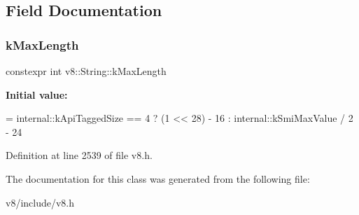 \subsection{Field Documentation}
\mbox{\label{classv8_1_1String_a66259940a4836974906729017ff25fd2}} 
\subsubsection{\texorpdfstring{k\+Max\+Length}{kMaxLength}}
{\footnotesize\ttfamily constexpr int v8\+::\+String\+::k\+Max\+Length\hspace{0.3cm}{\ttfamily [static]}}

{\bfseries Initial value\+:}
\begin{DoxyCode}
= internal::kApiTaggedSize == 4
                                        ? (1 << 28) - 16
                                        : internal::kSmiMaxValue / 2 - 24
\end{DoxyCode}


Definition at line 2539 of file v8.\+h.



The documentation for this class was generated from the following file\+:\begin{DoxyCompactItemize}
\item 
v8/include/v8.\+h\end{DoxyCompactItemize}
